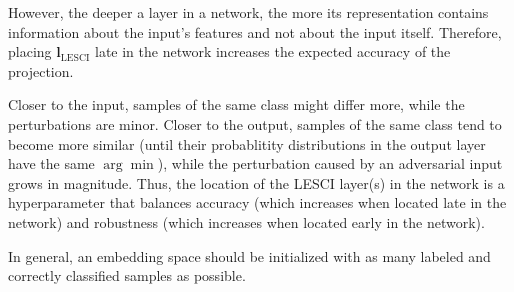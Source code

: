 \documentclass{article}
\begin{document}
However, the deeper a layer in a network, the more its representation contains information about the input's features and not about the input itself.
Therefore, placing $\bm{l}_\text{LESCI}$ late in the network increases the expected accuracy of the projection. 

Closer to the input, samples of the same class might differ more, while the perturbations are minor.
Closer to the output, samples of the same class tend to become more similar (until their probablitity distributions in the output layer have the same $\arg\min$), while the perturbation caused by an adversarial input grows in magnitude.
Thus, the location of the LESCI layer(s) in the network is a hyperparameter that balances accuracy (which increases when located late in the network) and robustness (which increases when located early in the network).

In general, an embedding space should be initialized with as many labeled and correctly classified samples as possible.


\end{document}
